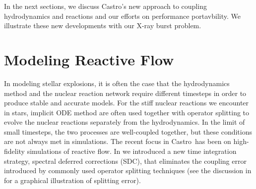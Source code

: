 \documentclass[a4paper]{jpconf}
\newcommand{\castro}{{\sffamily Castro}}
\begin{document}
In the next sections, we discuss \castro's new approach to coupling
hydrodynamics and reactions and our efforts on performance portavbility.
We illustrate these new developments with our X-ray burst problem.

\section{Modeling Reactive Flow}

In modeling stellar explosions, it is often the case that the
hydrodynamics method and the nuclear reaction network require
different timesteps in order to produce stable and accurate models.
For the stiff nuclear reactions we encounter in stars, implicit ODE
method are often used together with operator splitting to evolve the
nuclear reactions separately from the hydrodynamics.  In the limit of
small timesteps, the two processes are well-coupled together, but
these conditions are not always met in simulations.  The recent focus
in \castro\ has been on high-fidelity simulations of reactive flow.
In \cite{castro:sdc} we introduced a new time integration strategy,
spectral deferred corrections (SDC), that eliminates the coupling
error introduced by commonly used operator splitting techniques (see
the discussion in \cite{astronum:2018} for a graphical illustration of
splitting error).
\end{document}
